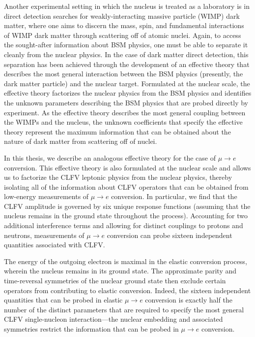 \documentclass{book}[letterpaper,12pt]
\begin{document}
Another experimental setting in which the nucleus is treated as a laboratory is in direct detection searches for weakly-interacting massive particle (WIMP) dark matter, where one aims to discern the mass, spin, and fundamental interactions of WIMP dark matter through scattering off of atomic nuclei. Again, to access the sought-after information about BSM physics, one must be able to separate it cleanly from the nuclear physics. In the case of dark matter direct detection, this separation has been achieved through the development of an effective theory that describes the most general interaction between the BSM physics (presently, the dark matter particle) and the nuclear target. Formulated at the nuclear scale, the effective theory factorizes the nuclear physics from the BSM physics and identifies the unknown parameters describing the BSM physics that are probed directly by experiment. As the effective theory describes the most general coupling between the WIMPs and the nucleus, the unknown coefficients that specify the effective theory represent the maximum information that can be obtained about the nature of dark matter from scattering off of nuclei. 

In this thesis, we describe an analogous effective theory for the case of $\mu\rightarrow e$ conversion. This effective theory is also formulated at the nuclear scale and allows us to factorize the CLFV leptonic physics from the nuclear physics, thereby isolating all of the information about CLFV operators that can be obtained from low-energy measurements of $\mu\rightarrow e$ conversion. In particular, we find that the CLFV amplitude is governed by six unique response functions (assuming that the nucleus remains in the ground state throughout the process). Accounting for two additional interference terms and allowing for distinct couplings to protons and neutrons, measurements of $\mu\rightarrow e$ conversion can probe sixteen independent quantities associated with CLFV. 

The energy of the outgoing electron is maximal in the elastic conversion process, wherein the nucleus remains in its ground state. The approximate parity and time-reversal symmetries of the nuclear ground state then exclude certain operators from contributing to elastic conversion. Indeed, the sixteen independent quantities that can be probed in elastic $\mu\rightarrow e$ conversion is exactly half the number of the distinct parameters that are required to specify the most general CLFV single-nucleon interaction---the nuclear embedding and associated symmetries restrict the information that can be probed in $\mu\rightarrow e$ conversion.
\end{document}
